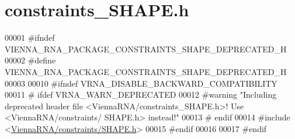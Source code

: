 \hypertarget{constraints__SHAPE_8h_source}{}\section{constraints\+\_\+\+S\+H\+A\+P\+E.\+h}
\label{constraints__SHAPE_8h_source}

\begin{DoxyCode}
00001 \textcolor{preprocessor}{#ifndef VIENNA\_RNA\_PACKAGE\_CONSTRAINTS\_SHAPE\_DEPRECATED\_H}
00002 \textcolor{preprocessor}{#define VIENNA\_RNA\_PACKAGE\_CONSTRAINTS\_SHAPE\_DEPRECATED\_H}
00003 
00010 \textcolor{preprocessor}{#ifndef VRNA\_DISABLE\_BACKWARD\_COMPATIBILITY}
00011 \textcolor{preprocessor}{# ifdef VRNA\_WARN\_DEPRECATED}
00012 \textcolor{preprocessor}{#warning "Including deprecated header file <ViennaRNA/constraints\_SHAPE.h>! Use <ViennaRNA/constraints/
      SHAPE.h> instead!"}
00013 \textcolor{preprocessor}{# endif}
00014 \textcolor{preprocessor}{#include <\hyperlink{SHAPE_8h}{ViennaRNA/constraints/SHAPE.h}>}
00015 \textcolor{preprocessor}{#endif}
00016 
00017 \textcolor{preprocessor}{#endif}
\end{DoxyCode}
